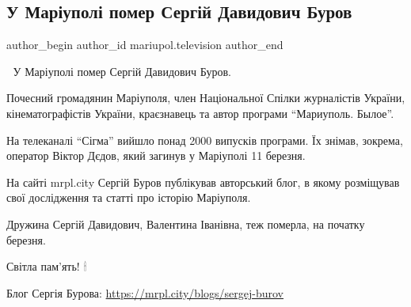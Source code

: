  
 
 
 
 

\subsection{У Маріуполі помер Сергій Давидович Буров}
\label{sec:21_04_2022.fb.mariupol.television.1.u_mariupoli_pomer_sergij_davydovych_burov}

\ifcmt
 author_begin
   author_id mariupol.television
 author_end
\fi

🥀 У Маріуполі помер Сергій Давидович Буров.

Почесний громадянин Маріуполя, член Національної Спілки журналістів України,
кінематографістів України, краєзнавець та автор програми \enquote{Мариуполь.
Былое}.

На телеканалі \enquote{Сігма} вийшло понад 2000 випусків програми. Їх знімав,
зокрема, оператор Віктор Дєдов, який загинув у Маріуполі 11 березня.

На сайті mrpl.city Сергій Буров публікував авторський блог, в якому розміщував
свої дослідження та статті про історію Маріуполя.

Дружина Сергій Давидович, Валентина Іванівна, теж померла, на початку березня.

Світла пам'ять! 🕯

Блог Сергія Бурова: \url{https://mrpl.city/blogs/sergej-burov}
